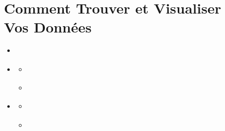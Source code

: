 \documentclass[letterpaper,10pt,english]{sphinxmanual}
\begin{document}
\section{Comment Trouver et Visualiser Vos Données}
\label{\detokenize{fr/02_trouver_visualiser:comment-trouver-et-visualiser-vos-donnees}}\label{\detokenize{fr/02_trouver_visualiser:find-fr}}\label{\detokenize{fr/02_trouver_visualiser::doc}}
\begin{sphinxcontents}
\begin{itemize}
\item {} 
\sphinxAtStartPar
{}\label{\detokenize{fr/02_trouver_visualiser:id1}}{\hyperref[\detokenize{fr/02_trouver_visualiser:acceder-au-catalogue}]{}}

\item {} 
\sphinxAtStartPar
{}\label{\detokenize{fr/02_trouver_visualiser:id2}}{\hyperref[\detokenize{fr/02_trouver_visualiser:filtrer-et-rechercher-dans-le-catalogue}]{}}
\begin{itemize}
\item {} 
\sphinxAtStartPar
{}\label{\detokenize{fr/02_trouver_visualiser:id3}}{\hyperref[\detokenize{fr/02_trouver_visualiser:utiliser-la-barre-de-recherche}]{}}

\item {} 
\sphinxAtStartPar
{}\label{\detokenize{fr/02_trouver_visualiser:id4}}{\hyperref[\detokenize{fr/02_trouver_visualiser:utiliser-les-filtres}]{}}

\end{itemize}

\item {} 
\sphinxAtStartPar
{}\label{\detokenize{fr/02_trouver_visualiser:id5}}{\hyperref[\detokenize{fr/02_trouver_visualiser:exemple-pas-a-pas-trouver-un-dataset-pelagos}]{}}
\begin{itemize}
\item {} 
\sphinxAtStartPar
{}\label{\detokenize{fr/02_trouver_visualiser:id6}}{\hyperref[\detokenize{fr/02_trouver_visualiser:etape-1-ouvrir-le-catalogue}]{}}

\item {} 
\sphinxAtStartPar
{}\label{\detokenize{fr/02_trouver_visualiser:id7}}{\hyperref[\detokenize{fr/02_trouver_visualiser:etape-2-rechercher-par-mot-cle}]{}}


\end{itemize}
\end{itemize}
\end{sphinxcontents}
\end{document}
